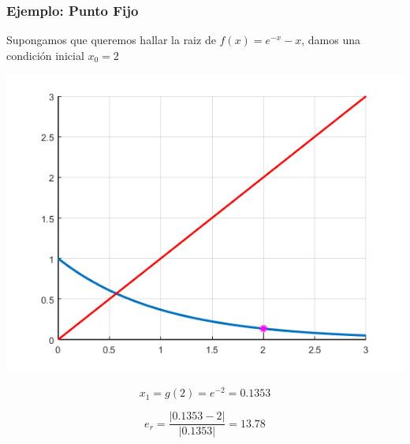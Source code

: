 \documentclass[xcolor=svgnames]{beamer} %
\theoremstyle{plain}
\theoremstyle{definition}
\begin{document}
\begin{frame}
\frametitle{Ejemplo: Punto Fijo}

Supongamos que queremos hallar la raiz de $f(x) = e^{-x} -x$,
damos una condición inicial $x_0=2$


\begin{minipage}{.45\linewidth}
\includegraphics[width=\linewidth]{fp_example/iter1.png} 

\end{minipage} \begin{minipage}{.45\linewidth}
$$ x_1 = g(2) = e^{-2} = 0.1353$$

$$e_r = \frac{|0.1353-2|}{|0.1353|} = 13.78$$
\end{minipage}
\end{frame}
\end{document}

